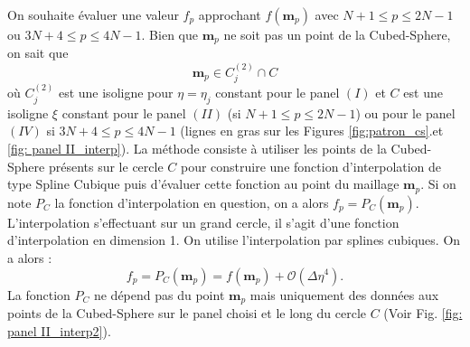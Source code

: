 On souhaite évaluer une valeur $f_p$ approchant $f(\mathbf{m}_p)$ avec $N+1 \leq p \leq 2N-1$ ou $3N+4 \leq p \leq 4N-1$. Bien que $\mathbf{m}_p$ ne soit pas un point de la Cubed-Sphere, on sait que 
\begin{equation}
\mathbf{m}_p \in C^{(2)}_j \cap C
\end{equation} 
où $C^{(2)}_j$ est une isoligne pour $\eta = \eta_j$ constant pour le panel $(I)$ et $C$ est une isoligne $\xi$ constant pour le panel $(II)$ (si $N+1 \leq p \leq 2N-1$) ou pour le panel $(IV)$ si $3N+4 \leq p \leq 4N-1$ (lignes en gras sur les Figures \ref{fig:patron_cs}.et \ref{fig: panel II_interp}).
La méthode consiste à utiliser les points de la Cubed-Sphere présents sur le cercle $C$ pour construire une fonction d'interpolation de type Spline Cubique puis d'évaluer cette fonction au point du maillage $\mathbf{m}_p$. Si on note $P_C$ la fonction d'interpolation en question, on a alors $f_p = P_C (\mathbf{m}_p)$. L'interpolation s'effectuant sur un grand cercle, il s'agit d'une fonction d'interpolation en dimension 1. On utilise l'interpolation par splines cubiques. On a alors \cite{Ahlberg2016} :
\begin{equation}
f_p = P_C(\mathbf{m}_p) = f(\mathbf{m}_p) + \mathcal{O}(\Delta \eta^4).
\end{equation}
La fonction $P_C$ ne dépend pas du point $\mathbf{m}_p$ mais uniquement des données aux points de la Cubed-Sphere sur le panel choisi et le long du cercle $C$ (Voir Fig. \ref{fig: panel II_interp2}).

